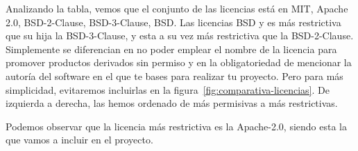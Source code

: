 Analizando la tabla, vemos que el conjunto de las licencias está en MIT, Apache 2.0, BSD-2-Clause, BSD-3-Clause, BSD. Las licencias BSD y es más restrictiva que su hija la BSD-3-Clause, y esta a su vez más restrictiva que la BSD-2-Clause. Simplemente se diferencian en no poder emplear el nombre de la licencia para promover productos derivados sin permiso y en la obligatoriedad de mencionar la autoría del software en el que te bases para realizar tu proyecto. Pero para más simplicidad, evitaremos incluirlas en la figura~\ref{fig:comparativa-licencias}. De izquierda a derecha, las hemos ordenado de más permisivas a más restrictivas.


Podemos observar que la licencia más restrictiva es la Apache-2.0, siendo esta la que vamos a incluir en el proyecto.